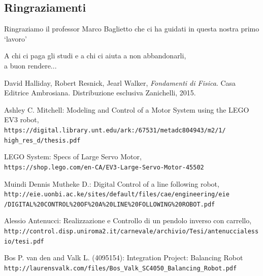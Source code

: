 \documentclass[a4paper,11pt,twoside]{book}
\makeatletter
\renewcommand{\frontmatter}{%
	\cleardoublepage\@mainmatterfalse 
	\pagenumbering{smallRoman}}
\makeatother
\begin{document}
\vfill


\newpage\null\thispagestyle{empty}\newpage

\frontmatter
\thispagestyle{empty}
\null{}
\begin{center}
	\section*{Ringraziamenti}
		Ringraziamo il professor Marco Baglietto che ci ha guidati in questa nostra primo `lavoro'
\end{center}
\null
\newpage
\begin{flushright}
	\null{}
	A chi ci paga gli studi e a chi ci aiuta a non abbandonarli,\\ a buon rendere...
	\null
\end{flushright}

\tableofcontents
\listoffigures
\listoftables
\mainmatter






\begin{thebibliography}{9}

	
	David Halliday, Robert Resnick, Jearl Walker, 
	\textit{Fondamenti di Fisica}. 
	Casa Editrice Ambrosiana. Distribuzione esclusiva Zanichelli, 2015.
	
	Ashley C. Mitchell: Modeling and Control of a Motor System using the LEGO EV3 robot,
	\\\texttt{https://digital.library.unt.edu/ark:/67531/metadc804943/m2/1/\\
		high\_res\_d/thesis.pdf}
	
	LEGO System: Specs of Large Servo Motor,
	\\\texttt{https://shop.lego.com/en-CA/EV3-Large-Servo-Motor-45502}
	
	Muindi Dennis Mutheke D.: Digital Control of a line following robot,
	\\\texttt{http://eie.uonbi.ac.ke/sites/default/files/cae/engineering/eie\\/DIGITAL\%20CONTROL\%20OF\%20A\%20LINE\%20FOLLOWING\%20ROBOT.pdf}
	
	Alessio Antenucci: Realizzazione e Controllo di un pendolo inverso con carrello,
	\\\texttt{http://control.disp.uniroma2.it/carnevale/archivio/Tesi/antenuccialessio/tesi.pdf}
	
	Bos P. van den and Valk L. (4095154): Integration Project: Balancing Robot
	\\\texttt{http://laurensvalk.com/files/Bos\_Valk\_SC4050\_Balancing\_Robot.pdf}

	
	
	
\end{thebibliography}
\end{document}
